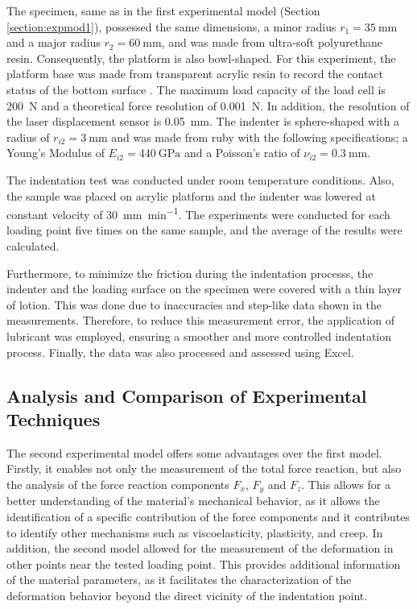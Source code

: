 The specimen, same as in the first experimental model (Section \ref{section:expmod1}),
 possessed the same dimensions, a minor radius $r_1 = \SI{35}{\milli \m}$ and a major 
 radius $r_2 = \SI{60}{\milli \m}$, and was
made from ultra-soft polyurethane resin. Consequently, the platform is also 
bowl-shaped. For this experiment, the platform base was made from transparent 
acrylic resin to record the contact status of the bottom surface \cite{Mori2022}. 
The maximum load capacity of the load cell is \SI{200}{\newton} and a theoretical 
force resolution of \SI{0.001}{\newton}. In addition, the resolution of the 
laser displacement sensor is \SI{0.05}{\milli \m}.
The indenter is sphere-shaped with a radius of $r_{i2} = \SI{3}{\milli \m}$ and
was made from ruby with the following specifications; 
a Young's Modulus of $E_{i2}  = \SI{440}{\giga \pascal}$ and a Poisson's ratio of 
$\nu_{i2} = \SI{0.3}{\milli \m}$.

The indentation test was conducted under room temperature conditions. Also, 
the sample was placed on acrylic platform and the indenter was 
lowered at constant velocity of \SI[per-mode = symbol]{30}{\milli \m\per \minute}. 
The experiments were conducted for each loading point five times on the same sample, 
and the average of the results were calculated.

Furthermore, to minimize the friction during the indentation processs, the indenter 
and the loading surface on the specimen were covered with a thin layer of lotion. 
This was done due to inaccuracies and step-like data shown in the measurements. Therefore, to reduce 
this measurement error, the application of lubricant was employed, ensuring a 
smoother and more controlled indentation process. Finally, the data 
was also processed and assessed using Excel.

\subsection*{Analysis and Comparison of Experimental Techniques}

The second experimental model offers some advantages over the first model. 
Firstly, it enables not only the measurement of the total force reaction, but also the analysis 
of the force reaction components $F_x$, $F_y$ and $F_z$. This allows for a better 
understanding of the material's mechanical behavior, as it allows the identification 
of a specific contribution of the force components and it contributes to identify other 
mechanisms such as viscoelasticity, plasticity, and creep. 
In addition, the second model allowed for the measurement of the deformation in other 
points near the tested loading point. This provides additional information of the 
material parameters, as it facilitates the characterization of the deformation behavior beyond the 
direct vicinity of the indentation point.

